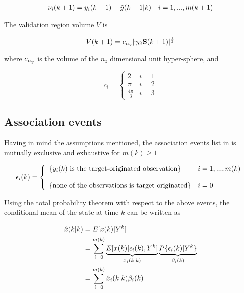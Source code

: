 $$\begin{aligned}
\nu_i(k+1) = {y}_i(k+1) - {\hat{{y}}}(k+1|k)  && i= 1, ...,m(k+1)
\end{aligned}
$$


The validation region volume $V$ is

$$V(k+1) = c_{n_{{y}}}|{\gamma_G} \mathbf{S}(k+1)|^\frac{1}{2}$$

where $c_{n_{y}}$ is the volume of the $n_z$ dimensional unit hyper-sphere, and


\begin{equation}\label{eq:ndimensionalvolume}
c_i =
\left\{\begin{array}{ll}
2  & i = 1 \\
\pi & i=2 \\
\frac{4\pi}{3} & i = 3
\end{array}
\right.
\end{equation}


\subsection{Association events}
Having in mind the assumptions mentioned, the association events list in  is mutually exclusive and exhaustive for $m(k)\geq1$

\begin{equation}\label{eq:associationevents}
\epsilon_i(k)  = \left\{
\begin{array}{ll}
\{{y}_i(k) \text{ is the target-originated observation} \} & i = 1,...,m(k) \\
\\
\{\text{none of the observations is target originated} \} & i=0
\end{array}\right.
\end{equation}

Using the total probability theorem with respect to the above events, the conditional mean of the state at time $k$ can be written as

\begin{equation}\label{eq:conditionalmean}
\begin{split}
\hat{x}(k|k) &= E[x(k)|{Y}^k] \\
&= \sum_{i=0}^{m(k)} \underbrace{E[x(k)|\epsilon_i(k),{Y}^k]}_{\hat{x}_i(k|k)} \underbrace{P\{\epsilon_i(k)|{Y}^k\}}_{\beta_i(k)}\\
&=\sum_{i=0}^{m(k)} \hat{x}_i(k|k) \beta_i(k)
\end{split}
\end{equation}
 
